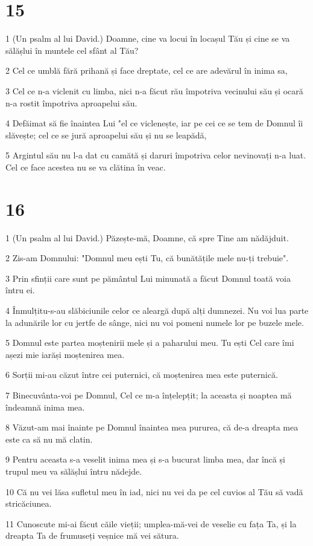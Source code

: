 \chapter{15}

\par 1 (Un psalm al lui David.) Doamne, cine va locui în locașul Tău și cine se va sălășlui în muntele cel sfânt al Tău?
\par 2 Cel ce umblă fără prihană și face dreptate, cel ce are adevărul în inima sa,
\par 3 Cel ce n-a viclenit cu limba, nici n-a făcut rău împotriva vecinului său și ocară n-a rostit împotriva aproapelui său.
\par 4 Defăimat să fie înaintea Lui "el ce viclenește, iar pe cei ce se tem de Domnul îi slăvește; cel ce se jură aproapelui său și nu se leapădă,
\par 5 Argintul său nu l-a dat cu camătă și daruri împotriva celor nevinovați n-a luat. Cel ce face acestea nu se va clătina în veac.

\chapter{16}

\par 1 (Un psalm al lui David.) Păzește-mă, Doamne, că spre Tine am nădăjduit.
\par 2 Zis-am Domnului: "Domnul meu ești Tu, că bunătățile mele nu-ți trebuie".
\par 3 Prin sfinții care sunt pe pământul Lui minunată a făcut Domnul toată voia întru ei.
\par 4 Înmulțitu-s-au slăbiciunile celor ce aleargă după alți dumnezei. Nu voi lua parte la adunările lor cu jertfe de sânge, nici nu voi pomeni numele lor pe buzele mele.
\par 5 Domnul este partea moștenirii mele și a paharului meu. Tu ești Cel care îmi așezi mie iarăși moștenirea mea.
\par 6 Sorții mi-au căzut între cei puternici, că moștenirea mea este puternică.
\par 7 Binecuvânta-voi pe Domnul, Cel ce m-a înțelepțit; la aceasta și noaptea mă îndeamnă inima mea.
\par 8 Văzut-am mai înainte pe Domnul înaintea mea pururea, că de-a dreapta mea este ca să nu mă clatin.
\par 9 Pentru aceasta s-a veselit inima mea și s-a bucurat limba mea, dar încă și trupul meu va sălășlui întru nădejde.
\par 10 Că nu vei lăsa sufletul meu în iad, nici nu vei da pe cel cuvios al Tău să vadă stricăciunea.
\par 11 Cunoscute mi-ai făcut căile vieții; umplea-mă-vei de veselie cu fața Ta, și la dreapta Ta de frumuseți veșnice mă vei sătura.

